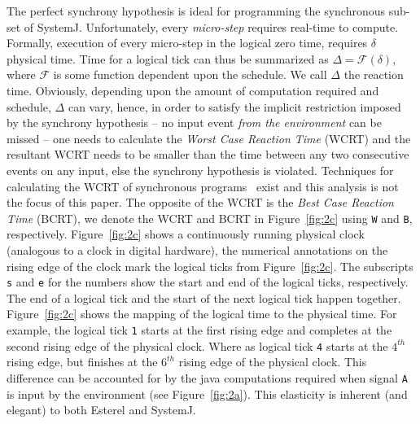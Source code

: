 The perfect synchrony hypothesis is ideal for programming the
synchronous sub-set of SystemJ. Unfortunately, every \textit{micro-step}
requires real-time to compute. Formally, execution of every micro-step
in the logical zero time, requires $\delta$ physical time. Time for a
logical tick can thus be summarized as $\Delta = \mathcal{F} (\delta)$,
where $\mathcal{F}$ is some function dependent upon the schedule. We
call $\Delta$ the reaction time. Obviously, depending upon the amount of
computation required and schedule, $\Delta$ can vary, hence, in order to
satisfy the implicit restriction imposed by the synchrony hypothesis --
no input event \textit{from the environment} can be missed -- one needs
to calculate the \textit{Worst Case Reaction Time} (WCRT) and the
resultant WCRT needs to be smaller than the time between any two
consecutive events on any input, else the synchrony hypothesis is
violated. Techniques for calculating the WCRT of synchronous
programs~\cite{boldt07} exist and this analysis is not the focus of this
paper. The opposite of the WCRT is the \textit{Best Case Reaction Time}
(BCRT), we denote the WCRT and BCRT in Figure~\ref{fig:2c} using
\texttt{W} and \texttt{B}, respectively. Figure~\ref{fig:2c} shows a
continuously running physical clock (analogous to a clock in digital
hardware), the numerical annotations on the rising edge of the clock
mark the logical ticks from Figure~\ref{fig:2c}. The subscripts
\texttt{s} and \texttt{e} for the numbers show the start and end of the
logical ticks, respectively. The end of a logical tick and the start of
the next logical tick happen together. Figure~\ref{fig:2c} shows the
mapping of the logical time to the physical time. For example, the
logical tick \texttt{1} starts at the first rising edge and completes at
the second rising edge of the physical clock. Where as logical tick
\texttt{4} starts at the $4^{th}$ rising edge, but finishes at the
$6^{th}$ rising edge of the physical clock. This difference can be
accounted for by the java computations required when signal \texttt{A}
is input by the environment (see Figure~\ref{fig:2a}). This elasticity
is inherent (and elegant) to both Esterel and SystemJ.



